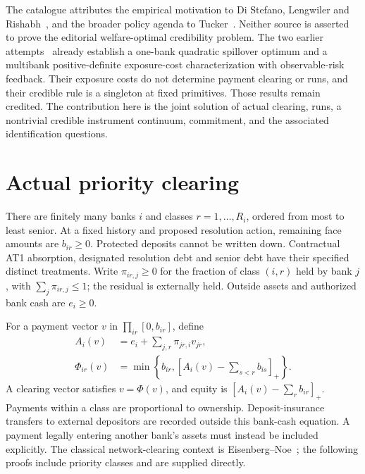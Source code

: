\documentclass[11pt,a4paper]{article}
\numberwithin{equation}{section}
\theoremstyle{definition}
\begin{document}
The catalogue attributes the empirical motivation to Di Stefano, Lengwiler
and Rishabh~\cite{bis}, and the broader policy agenda to Tucker~\cite{tucker}.
Neither source is asserted to prove the editorial welfare-optimal
credibility problem. The two earlier attempts~\cite{priorone,priortwo}
already establish a one-bank quadratic spillover optimum and a multibank
positive-definite exposure-cost characterization with observable-risk
feedback. Their exposure costs do not determine payment clearing or runs,
and their credible rule is a singleton at fixed primitives. Those results
remain credited. The contribution here is the joint solution of actual
clearing, runs, a nontrivial credible instrument continuum, commitment,
and the associated identification questions.

\section{Actual priority clearing}\label{sec:clearing}

There are finitely many banks \(i\) and classes \(r=1,\ldots,R_i\), ordered
from most to least senior. At a fixed history and proposed resolution
action, remaining face amounts are \(b_{ir}\ge0\). Protected deposits cannot
be written down. Contractual AT1 absorption, designated resolution debt
and senior debt have their specified distinct treatments. Write
\(\pi_{ir,j}\ge0\) for the fraction of class \((i,r)\) held by bank \(j\),
with \(\sum_j\pi_{ir,j}\le1\); the residual is externally held.
Outside assets and authorized bank cash are \(e_i\ge0\).

For a payment vector \(v\) in \(\prod_{ir}[0,b_{ir}]\), define
\begin{equation}\label{eq:waterfall}
\begin{aligned}
A_i(v)&=e_i+\sum_{j,r}\pi_{jr,i}v_{jr},\\
\Phi_{ir}(v)&=\min\left\{b_{ir},
                   \left[A_i(v)-\sum_{s<r}b_{is}\right]_+\right\}.
\end{aligned}
\end{equation}
A clearing vector satisfies \(v=\Phi(v)\), and equity is
\([A_i(v)-\sum_r b_{ir}]_+\). Payments within a class are proportional to
ownership. Deposit-insurance transfers to external depositors are recorded
outside this bank-cash equation. A payment legally entering another bank's
assets must instead be included explicitly. The classical network-clearing
context is Eisenberg--Noe~\cite{en}; the following proofs include priority
classes and are supplied directly.
\end{document}
